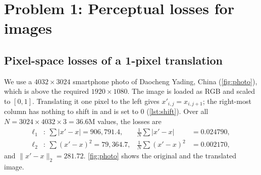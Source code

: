 \documentclass[10pt,twocolumn,letterpaper]{article}
\begin{document}
\begin{table}[t]
\centering\footnotesize\setlength{\tabcolsep}{3pt}
\caption{Main results at a glance. Details are in the section for each problem.}
\label{tab:summary}
\end{table}

\section{Problem 1: Perceptual losses for images}
\label{sec:p1}

\subsection{Pixel-space losses of a 1-pixel translation}
\label{sec:p1-1}
We use a $4032{\times}3024$ smartphone photo of Daocheng Yading, China (\cref{fig:photo}), which is above the required $1920{\times}1080$. The image is loaded as RGB and scaled to $[0,1]$. Translating it one pixel to the left gives $x'_{i,j}=x_{i,j+1}$; the right-most column has nothing to shift in and is set to 0 (\cref{lst:shift}). Over all $N=3024{\times}4032{\times}3=36.6$M values, the losses are
\begin{align}
\ell_1&:\ \textstyle\sum|x'-x| = 906{,}791.4, & \tfrac1N\sum|x'-x| &= 0.024790,\\
\ell_2&:\ \textstyle\sum(x'-x)^2 = 79{,}364.7, & \tfrac1N\sum(x'-x)^2 &= 0.002170,
\end{align}
and $\|x'-x\|_2=281.72$. \cref{fig:photo} shows the original and the translated image.
\end{document}
